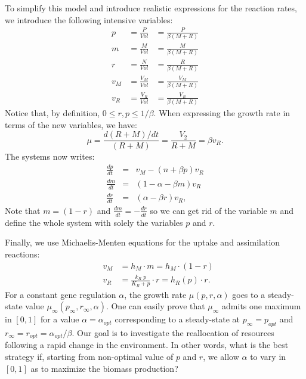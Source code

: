 \documentclass[a4paper, 10pt, conference]{ieeeconf}      %
\begin{document}
To simplify this model and introduce realistic expressions for the reaction rates, we introduce the following intensive variables:
\begin{eqnarray*}
p &= \frac{P}{Vol} &= \frac{P}{\beta (M+R)} \\
m &= \frac{M}{Vol} &= \frac{M}{\beta (M+R)}\\
r &= \frac{N}{Vol} &= \frac{R}{\beta (M+R)}\\
v_M &= \frac{V_M}{Vol} &= \frac{V_M}{\beta (M+R)}\\
v_R &= \frac{V_R}{Vol} &= \frac{V_R}{\beta (M+R)}
\end{eqnarray*}
Notice that, by definition, $0 \leq r, p \leq 1/\beta$. When expressing the growth rate in
terms of the new variables, we have:
\[
\mu = \frac{d(R+M)/dt}{(R+M)}= \frac{V_2}{R+M} = \beta v_R.
\]
The systems now writes:
\begin{eqnarray*}
\frac{dp}{dt} &=& v_M - (n + \beta p) v_R \\
\frac{dm}{dt} &=& (1-\alpha - \beta m) v_R \\ 
\frac{dr}{dt} &=& (\alpha - \beta r) v_R,
\end{eqnarray*}
Note that $m = (1 - r)$ and $\frac{dm}{dt} = - \frac{dr}{dt}$ so we can get rid of the variable $m$ and define the whole system with solely the variables $p$ and $r$.

Finally, we use Michaelis-Menten equations for the uptake and assimilation reactions:
\begin{eqnarray}
&v_M &= h_M \cdot m = h_M \cdot (1-r) \\
&v_R &= \frac{k_R \; p}{K_R + p} \cdot r = h_R(p) \cdot r.
\end{eqnarray}
For a constant gene regulation $\alpha$, the growth rate $\mu(p,r,\alpha)$ goes to a steady-state value $\mu_\infty(p_\infty, r_\infty, \alpha)$.
One can easily prove that $\mu_\infty$ admits one maximum in $[0,1]$ for a value $\alpha = \alpha_{opt}$ corresponding to a steady-state at $p_\infty = p_{opt}$ and $r_\infty = r_{opt} = \alpha_{opt}/ \beta$.
Our goal is to investigate the reallocation of resources following a rapid change in the environment.
In other words, what is the best strategy if, starting from non-optimal value of $p$ and $r$, we allow $\alpha$ to vary in $[0, 1]$ as to maximize the biomass production?
\end{document}
